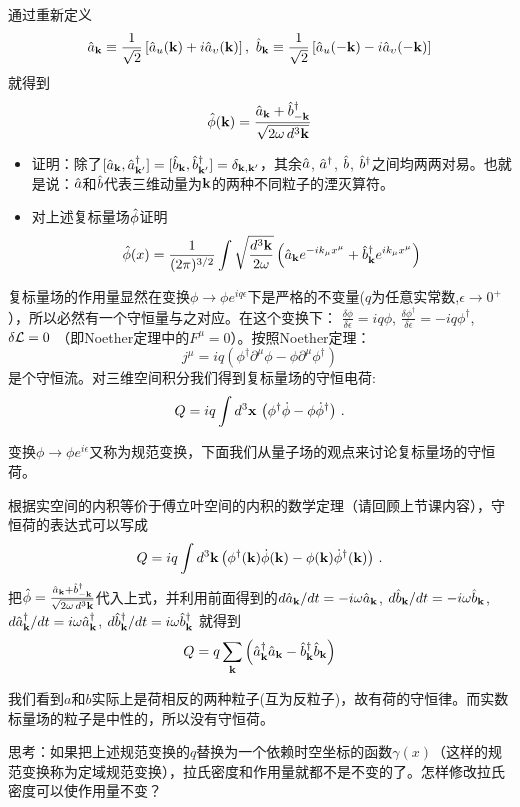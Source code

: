\documentclass[CJK]{beamer}
\begin{document}
\begin{frame}
\bch

通过重新定义
$$\hata_\veck \equiv \frac{1}{\sqrt{2}}\left[\hata_u(\veck) + i\hata_\vel(\veck)\right],\ \hatb_\veck \equiv\frac{1}{\sqrt{2}}\left[\hata_u(-\veck) -i \hata_\vel(-\veck)\right]$$
就得到
$$\hat{\phi}({\mathbf{k}}) = \frac{\hat{a}_{{\mathbf{k}}}+{\hat{b}^\dagger}_{-{\mathbf{k}}}}{\sqrt{2\omega\, d^3{\mathbf{k}}}}$$

\ech
\end{frame}

\begin{frame}
\bch
\begin{itemize}
\item{证明：除了$[\hat{a}_{\mathbf{k}},{\hat{a}^\dagger}_{{\mathbf{k}}'}]=[\hat{b}_{\mathbf{k}},{\hat{b}^\dagger}_{{\mathbf{k}}'}]=\delta_{{\mathbf{k}},{\mathbf{k}}'}$，其余$\hat{a}$, ${\hat{a}^\dagger}$, $\hat{b}$, ${\hat{b}^\dagger}$之间均两两对易。也就是说：$\hat{a}$和$\hat{b}$代表三维动量为${\mathbf{k}}$的两种不同粒子的湮灭算符。}
\item{对上述复标量场$\hat{\phi}$证明$$\hat{\phi}(x) = \frac{1}{(2\pi)^{3/2}} \int \sqrt{\frac{d^3{\mathbf{k}}}{2\omega}} \left(\hat{a}_{{\mathbf{k}}} e^{-ik_\mu x^\mu} + {\hat{b}^\dagger}_{{\mathbf{k}}}e^{ik_\mu x^\mu}\right) $$}
\end{itemize}
\ech
\end{frame}

\begin{frame}
\bch
复标量场的作用量显然在变换$\phi \rightarrow \phi e^{iq\epsilon}$下是严格的不变量($q$为任意实常数,$\epsilon\rightarrow 0^+$），所以必然有一个守恒量与之对应。在这个变换下：
$\frac{\delta \phi}{\delta \epsilon} = iq\phi$, $\frac{\delta\phi^\dagger}{\delta\epsilon} = - i q\phi^\dagger$, $\delta {\mathcal{L}} = 0$ （即Noether定理中的$F^\mu = 0$）。按照Noether定理：
$$j^\mu = iq\left(\phi^\dagger\partial^\mu\phi-\phi\partial^\mu\phi^\dagger\right)$$
是个守恒流。对三维空间积分我们得到复标量场的守恒电荷:
$$Q = iq\int d^3{\mathbf{x}}\, \left(\phi^\dagger \dot\phi  - \phi \dot\phi^\dagger\right)\,.$$

\skipline
变换$\phi \rightarrow \phi e^{i\epsilon}$又称为规范变换，下面我们从量子场的观点来讨论复标量场的守恒荷。

\ech
\end{frame}

\begin{frame}
\bch
根据实空间的内积等价于傅立叶空间的内积的数学定理（请回顾上节课内容），守恒荷的表达式可以写成
$$Q = iq \int d^3{\mathbf{k}} \left(\phi^\dagger({\mathbf{k}}) \dot\phi ({\mathbf{k}}) - \phi ({\mathbf{k}})\dot\phi^\dagger({\mathbf{k}})\right)\, .$$
把$\hat{\phi} = \frac{\hat{a}_{\mathbf{k}} + {\hat{b}^\dagger}_{-{\mathbf{k}}}}{\sqrt{2\omega\, d^3{\mathbf{k}}}}$代入上式，并利用前面得到的$d \hat{a}_{\mathbf{k}}/dt = -i\omega\hat{a}_{\mathbf{k}}$, $d \hat{b}_{\mathbf{k}}/dt = -i\omega\hat{b}_{\mathbf{k}}$, $d{\hat{a}^\dagger}_{\mathbf{k}}/dt = i\omega{\hat{a}^\dagger}_{\mathbf{k}}$, $d{\hat{b}^\dagger}_{\mathbf{k}}/dt = i\omega {\hat{b}^\dagger}_{\mathbf{k}}$  就得到
$$Q =q\sum_{{\mathbf{k}}} \left({\hat{a}^\dagger}_{\mathbf{k}}\hat{a}_{\mathbf{k}} - {\hat{b}^\dagger}_{{\mathbf{k}}}\hat{b}_{{\mathbf{k}}}\right)$$

我们看到$a$和$b$实际上是荷相反的两种粒子(互为反粒子)，故有荷的守恒律。而实数标量场的粒子是中性的，所以没有守恒荷。
\ech
\end{frame}

\begin{frame}
\bch
思考：如果把上述规范变换的$q$替换为一个依赖时空坐标的函数$\gamma(x)$（这样的规范变换称为定域规范变换），拉氏密度和作用量就都不是不变的了。怎样修改拉氏密度可以使作用量不变？
\ech
\end{frame}
\end{document}

